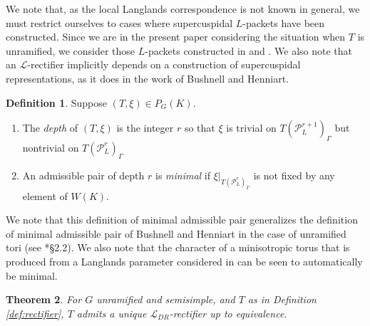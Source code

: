 \documentclass{mrlart7}
\theoremstyle{plain}
\newtheorem{theorem}{Theorem}[section]
\theoremstyle{definition}
\newtheorem{definition}[theorem]{Definition}
\numberwithin{equation}{section}
\newcommand{\PL}{\mathcal{P}_L}
\newcommand{\Lpack}{\mathcal{L}}
\begin{document}
We note that, as the local Langlands correspondence is not known in general, we must restrict
ourselves to cases where supercuspidal $L$-packets have been constructed.
Since we are in the present paper considering the situation when $T$ is unramified,
we consider those $L$-packets constructed in \cite{reeder-debacker:09a} and \cite{reeder:08a}.
We also note that an $\Lpack$-rectifier implicitly depends on a construction of supercuspidal
representations, as it does in the work of Bushnell and Henniart.

\begin{definition}\label{def:general_pair}
Suppose $(T, \xi) \in P_G(K)$.
\begin{enumerate}
\item The \emph{depth} of $(T, \xi)$ is the integer $r$ so that $\xi$
is trivial on $T(\PL^{r+1})_{\Gamma}$ but nontrivial on
$T(\PL^{r})_{\Gamma}$
\item An admissible pair of depth $r$ is \emph{minimal}
if $\xi|_{T(\PL^{r})_{\Gamma}}$
is not fixed by any element of $W(K)$.
\end{enumerate}
\end{definition}

We note that this definition of minimal admissible pair generalizes
the definition of minimal admissible pair of Bushnell and Henniart in
the case of unramified tori (see \cite{bushnell-henniart:05a}*{\S2.2}).  We also note that the
character of a minisotropic torus that is produced from a Langlands parameter considered
in \cite{reeder:08a} can be seen to automatically be minimal.

\begin{theorem} \label{thm:unique_semisimple}
For $G$ unramified and semisimple, and $T$ as in Definition \ref{def:rectifier},
$T$ admits a unique $\Lpack_{DR}$-rectifier up to equivalence.
\end{theorem}
\end{document}
